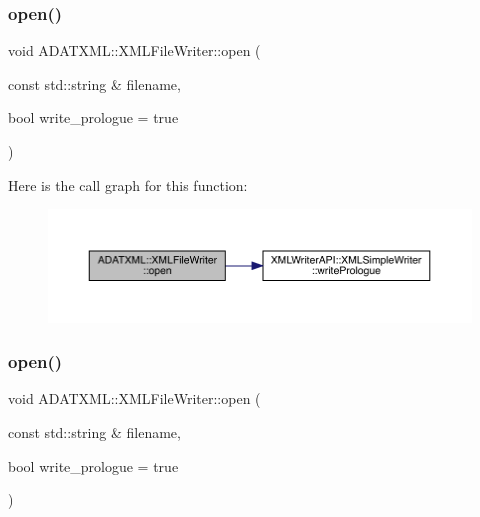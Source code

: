 \subsubsection{\texorpdfstring{open()}{open()}\hspace{0.1cm}{\footnotesize\ttfamily [2/3]}}
{\footnotesize\ttfamily void A\+D\+A\+T\+X\+M\+L\+::\+X\+M\+L\+File\+Writer\+::open (\begin{DoxyParamCaption}\item[{const std\+::string \&}]{filename,  }\item[{bool}]{write\+\_\+prologue = {\ttfamily true} }\end{DoxyParamCaption})\hspace{0.3cm}{\ttfamily [inline]}}

Here is the call graph for this function\+:
\nopagebreak
\begin{figure}[H]
\begin{center}
\leavevmode
\includegraphics[width=350pt]{d6/ddb/classADATXML_1_1XMLFileWriter_a76f52e7ccdfe3b82875f30953cfd2447_cgraph}
\end{center}
\end{figure}
\mbox{\label{classADATXML_1_1XMLFileWriter_a76f52e7ccdfe3b82875f30953cfd2447}} 
\subsubsection{\texorpdfstring{open()}{open()}\hspace{0.1cm}{\footnotesize\ttfamily [3/3]}}
{\footnotesize\ttfamily void A\+D\+A\+T\+X\+M\+L\+::\+X\+M\+L\+File\+Writer\+::open (\begin{DoxyParamCaption}\item[{const std\+::string \&}]{filename,  }\item[{bool}]{write\+\_\+prologue = {\ttfamily true} }\end{DoxyParamCaption})\hspace{0.3cm}{\ttfamily [inline]}}

